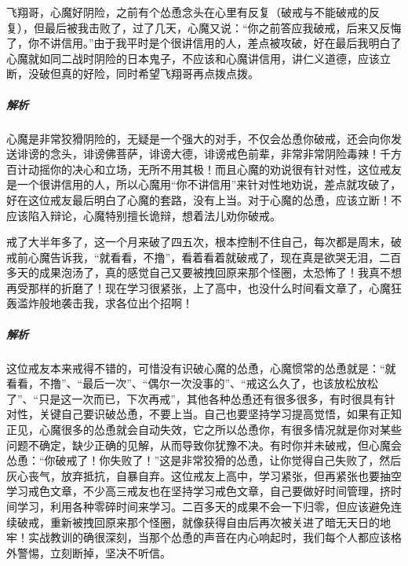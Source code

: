 \begin{case}[狡猾阴险毒辣的心魔]
    飞翔哥，心魔好阴险，之前有个怂恿念头在心里有反复（破戒与不能破戒的反复），但最后被我击败了，过了几天，心魔又说：“你之前答应我破戒，后来又反悔了，你不讲信用。”由于我平时是个很讲信用的人，差点被攻破，好在最后我明白了心魔就如同二战时阴险的日本鬼子，不应该和心魔讲信用，讲仁义道德，应该立断，没破但真的好险，同时希望飞翔哥再点拨点拨。
    \subparagraph{解析} 心魔是非常狡猾阴险的，无疑是一个强大的对手，不仅会怂恿你破戒，还会向你发送诽谤的念头，诽谤佛菩萨，诽谤大德，诽谤戒色前辈，非常非常阴险毒辣！千方百计动摇你的决心和立场，无所不用其极！而且心魔的劝说很有针对性，这位戒友是一个很讲信用的人，所以心魔用“你不讲信用”来针对性地劝说，差点就攻破了，好在这位戒友最后明白了心魔的套路，没有上当。对于心魔的怂恿，应该立断！不应该陷入辩论，心魔特别擅长诡辩，想着法儿劝你破戒。
\end{case}

\begin{case}[不要听信心魔的怂恿]
    戒了大半年多了，这一个月来破了四五次，根本控制不住自己，每次都是周末，破戒前心魔告诉我，“就看看，不撸”，看着看着就破戒了，现在真是欲哭无泪，二百多天的成果泡汤了，真的感觉自己又要被拽回原来那个怪圈，太恐怖了！我真不想再受那样的折磨了！现在学习很紧张，上了高中，也没什么时间看文章了，心魔狂轰滥炸般地袭击我，求各位出个招啊！
    \subparagraph{解析} 这位戒友本来戒得不错的，可惜没有识破心魔的怂恿，心魔惯常的怂恿就是：“就看看，不撸”、“最后一次”、“偶尔一次没事的”、“戒这么久了，也该放松放松了”、“只是这一次而已，下次再戒”，其他各种怂恿还有很多很多，有时很具有针对性，关键自己要识破怂恿，不要上当。自己也要坚持学习提高觉悟，如果有正知正见，心魔很多的怂恿就会自动失效，它之所以怂恿你，有很多情况就是你对某些问题不确定，缺少正确的见解，从而导致你犹豫不决。有时你并未破戒，但心魔会怂恿：“你破戒了！你失败了！”这是非常狡猾的怂恿，让你觉得自己失败了，然后灰心丧气，放弃抵抗，自暴自弃。这位戒友上高中，学习紧张，但再紧张也要抽空学习戒色文章，不少高三戒友也在坚持学习戒色文章，自己要做好时间管理，挤时间学习，利用各种零碎时间来学习。二百多天的成果不会一下归零，但应该避免连续破戒，重新被拽回原来那个怪圈，就像获得自由后再次被关进了暗无天日的地牢！实战教训的确很深刻，当那个怂恿的声音在内心响起时，我们每个人都应该格外警惕，立刻断掉，坚决不听信。
\end{case}

